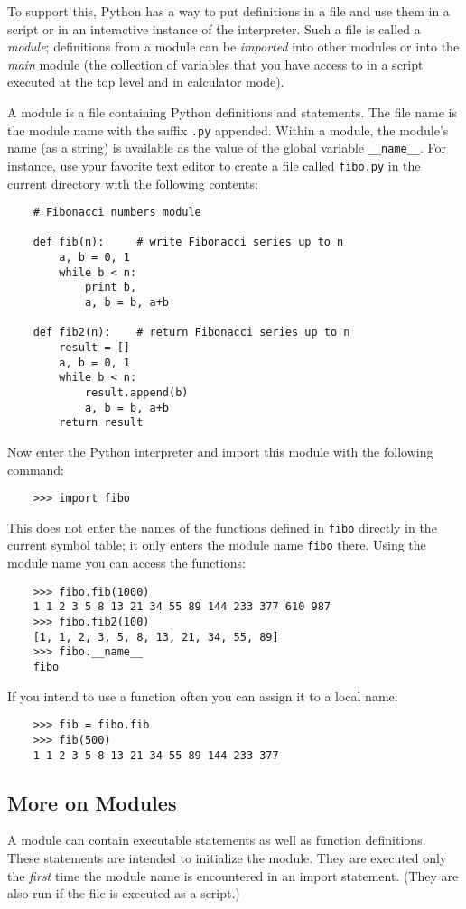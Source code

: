 \documentclass[UTF8]{article}
\begin{document}
To support this, Python has a way to put definitions in a file and use them in a script or in an
interactive instance of the interpreter. Such a file is called a \emph{module}; definitions from a
module can be \emph{imported} into other modules or into the \emph{main} module (the collection of
variables that you have access to in a script executed at the top level and in calculator mode).

A module is a file containing Python definitions and statements. The file name is the module name
with the suffix \texttt{.py} appended. Within a module, the module's name (as a string) is
available as the value of the global variable \texttt{\_\_name\_\_}. For instance, use your favorite
text editor to create a file called \texttt{fibo.py} in the current directory with the following
contents:
\begin{verbatim}
    # Fibonacci numbers module

    def fib(n):     # write Fibonacci series up to n
        a, b = 0, 1
        while b < n:
            print b,
            a, b = b, a+b

    def fib2(n):    # return Fibonacci series up to n
        result = []
        a, b = 0, 1
        while b < n:
            result.append(b)
            a, b = b, a+b
        return result
\end{verbatim}

Now enter the Python interpreter and import this module with the following command:
\begin{verbatim}
    >>> import fibo
\end{verbatim}

This does not enter the names of the functions defined in \texttt{fibo} directly in the current
symbol table; it only enters the module name \texttt{fibo} there. Using the module name you can
access the functions:
\begin{verbatim}
    >>> fibo.fib(1000)
    1 1 2 3 5 8 13 21 34 55 89 144 233 377 610 987
    >>> fibo.fib2(100)
    [1, 1, 2, 3, 5, 8, 13, 21, 34, 55, 89]
    >>> fibo.__name__
    fibo
\end{verbatim}

If you intend to use a function often you can assign it to a local name:
\begin{verbatim}
    >>> fib = fibo.fib
    >>> fib(500)
    1 1 2 3 5 8 13 21 34 55 89 144 233 377
\end{verbatim}

\subsection{More on Modules}
A module can contain executable statements as well as function definitions. These statements are
intended to initialize the module. They are executed only the \emph{first} time the module name is
encountered in an import statement. (They are also run if the file is executed as a script.)
\end{document}
